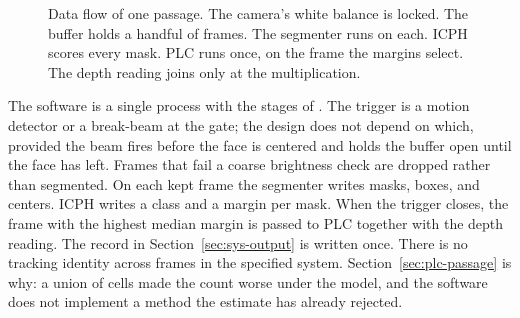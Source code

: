 \begin{figure}[t]
\centering
{}
\caption{Data flow of one passage. The camera's white balance is locked. The buffer holds a handful of frames. The segmenter runs on each. ICPH scores every mask. PLC runs once, on the frame the margins select. The depth reading joins only at the multiplication.}
\label{fig:dataflow}
\end{figure}

The software is a single process with the stages of . The trigger is a motion detector or a break-beam at the gate; the design does not depend on which, provided the beam fires before the face is centered and holds the buffer open until the face has left. Frames that fail a coarse brightness check are dropped rather than segmented. On each kept frame the segmenter writes masks, boxes, and centers. ICPH writes a class and a margin per mask. When the trigger closes, the frame with the highest median margin is passed to PLC together with the depth reading. The record in Section~\ref{sec:sys-output} is written once. There is no tracking identity across frames in the specified system. Section~\ref{sec:plc-passage} is why: a union of cells made the count worse under the model, and the software does not implement a method the estimate has already rejected.

